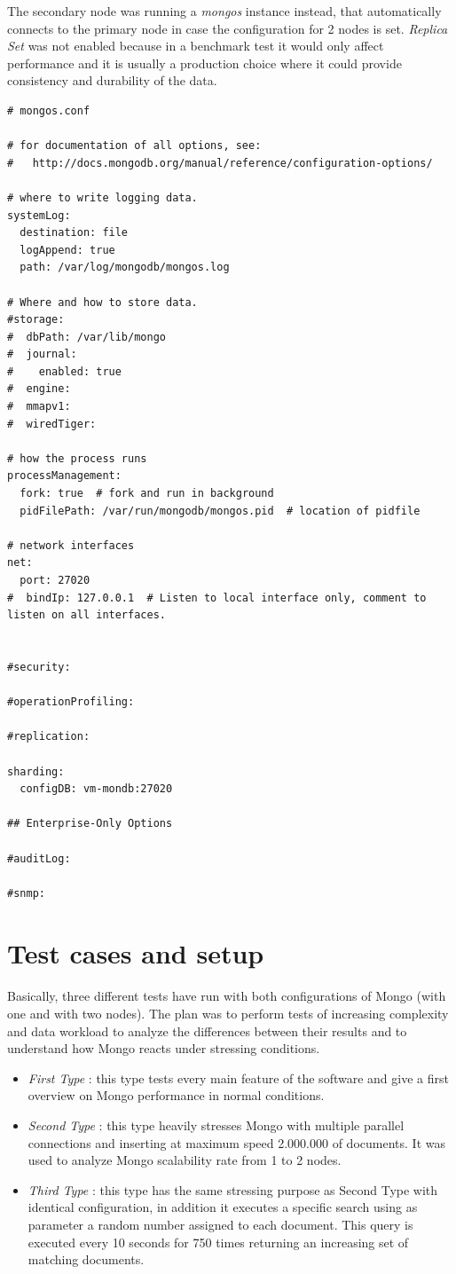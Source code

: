 The secondary node was running a \textit{mongos} instance instead, that automatically connects to the primary node in case the configuration for 2 nodes is set. \textit{Replica Set} was not enabled because in a benchmark test it would only affect performance and it is usually a production choice where it could provide consistency and durability of the data.
\begin{lstlisting}
# mongos.conf

# for documentation of all options, see:
#   http://docs.mongodb.org/manual/reference/configuration-options/

# where to write logging data.
systemLog:
  destination: file
  logAppend: true
  path: /var/log/mongodb/mongos.log

# Where and how to store data.
#storage:
#  dbPath: /var/lib/mongo
#  journal:
#    enabled: true
#  engine:
#  mmapv1:
#  wiredTiger:

# how the process runs
processManagement:
  fork: true  # fork and run in background
  pidFilePath: /var/run/mongodb/mongos.pid  # location of pidfile

# network interfaces
net:
  port: 27020
#  bindIp: 127.0.0.1  # Listen to local interface only, comment to listen on all interfaces.


#security:

#operationProfiling:

#replication:

sharding:
  configDB: vm-mondb:27020

## Enterprise-Only Options

#auditLog:

#snmp:
\end{lstlisting}

 
\section{Test cases and setup}
\label{sec:2}
Basically, three different tests have run with both configurations of Mongo (with one and with two nodes). 
The plan was to perform tests of increasing complexity and data workload to analyze the differences between their results and to  understand how Mongo reacts under stressing conditions.
\begin{itemize}
	\item \textit{First Type} : this type tests every main feature of the software and  give a first overview on Mongo performance in normal conditions.
	\item \textit{Second Type} : this type heavily stresses Mongo with multiple parallel connections and inserting at maximum speed 2.000.000 of documents. It was used to analyze Mongo scalability rate from 1 to 2 nodes.
	\item \textit{Third Type} : this type has the same stressing purpose as Second Type with identical configuration, in addition it executes a specific search using as parameter a random number assigned to each document. This query is executed every 10 seconds for 750 times returning an increasing set of matching documents.
\end{itemize}


